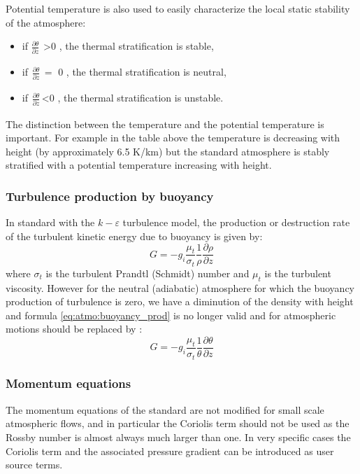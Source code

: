 Potential temperature is also used to easily characterize the local static
stability of the atmosphere:
\begin{itemize}
  \item if $\frac{\partial \theta }{\partial z}_{\, \, \, }$\textgreater 0 , the
    thermal stratification is stable,
  \item if$_{\, \, \, }\frac{\partial \theta }{\partial z}_{\, }=$ 0 , the
    thermal stratification is neutral,
  \item if$_{\, \, \, }\frac{\partial \theta }{\partial z}_{\, }$\textless 0 ,
    the thermal stratification is unstable.
\end{itemize}

The distinction between the temperature and the potential temperature is
important. For example in the table above the temperature is decreasing with
height (by approximately 6.5 K/km) but the standard atmosphere is stably
stratified with a potential temperature increasing with height.


\subsubsection{Turbulence production by buoyancy}
In standard \CS with the $k-\varepsilon$ turbulence model, the production or destruction rate of the turbulent kinetic energy due to buoyancy is given by:
\begin{equation}
\label{eq:atmo:buoyancy_prod}
G=-g_{i} \frac{\mu_{t} }{\sigma_{t} }\frac{1}{\rho }\frac{\partial \rho
}{\partial z}
\end{equation}
where $\sigma_{t}$ is the turbulent Prandtl (Schmidt) number and $\mu_{t}$ is the turbulent viscosity.
However for the neutral (adiabatic) atmosphere for which the buoyancy
production of turbulence is zero, we have a diminution of the density with
height and formula \eqref{eq:atmo:buoyancy_prod} is no longer valid and for atmospheric motions should
be replaced by \cite{Stull:1988}:
\begin{equation}
\label{eq:atmo:eq4}
G=-g_{i} \frac{\mu_{t}}{\sigma_{t} }\frac{1}{\theta }\frac{\partial \theta
}{\partial z}
\end{equation}

\subsubsection{ Momentum equations }
The momentum equations of the standard \CS are not
modified for small scale atmospheric flows, and in particular the Coriolis
term should not be used as the Rossby number is almost always much larger
than one. In very specific cases the Coriolis term and the associated
pressure gradient can be introduced as user source terms.

